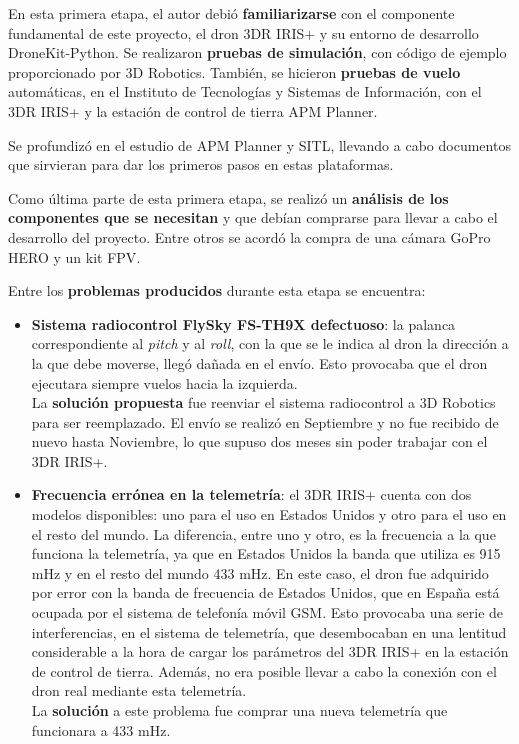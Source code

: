 En esta primera etapa, el autor debió \textbf{familiarizarse} con el componente fundamental de este proyecto, el dron 3DR IRIS+ y su entorno de desarrollo DroneKit-Python. Se realizaron \textbf{pruebas de simulación}, con código de ejemplo proporcionado por 3D Robotics. También, se hicieron \textbf{pruebas de vuelo} automáticas, en el Instituto de Tecnologías y Sistemas de Información, con el 3DR IRIS+ y la estación de control de tierra APM Planner.

Se profundizó en el estudio de APM Planner y \acs{SITL}, llevando a cabo documentos que sirvieran para dar los primeros pasos en estas plataformas.

Como última parte de esta primera etapa, se realizó un \textbf{análisis de los componentes que se necesitan} y que debían comprarse para llevar a cabo el desarrollo del proyecto. Entre otros se acordó la compra de una cámara GoPro HERO y un kit \acs{FPV}.

Entre los \textbf{problemas producidos} durante esta etapa se encuentra:
\begin{itemize}
\item \textbf{Sistema radiocontrol FlySky FS-TH9X defectuoso}: la palanca correspondiente al \textit{pitch} y al \textit{roll}, con la que se le indica al dron la dirección a la que debe moverse, llegó dañada en el envío. Esto provocaba que el dron ejecutara siempre vuelos hacia la izquierda.\\ La \textbf{solución propuesta} fue reenviar el sistema radiocontrol a 3D Robotics para ser reemplazado. El envío se realizó en Septiembre y no fue recibido de nuevo hasta Noviembre, lo que supuso dos meses sin poder trabajar con el 3DR IRIS+.
\item \textbf{Frecuencia errónea en la telemetría}: el 3DR IRIS+ cuenta con dos modelos disponibles: uno para el uso en Estados Unidos y otro para el uso en el resto del mundo. La diferencia, entre uno y otro, es la frecuencia a la que funciona la telemetría, ya que en Estados Unidos la banda que utiliza es 915 mHz y en el resto del mundo 433 mHz. En este caso, el dron fue adquirido por error con la banda de frecuencia de Estados Unidos, que en España está ocupada por el sistema de telefonía móvil \acs{GSM}. Esto provocaba una serie de interferencias, en el sistema de telemetría, que desembocaban en una lentitud considerable a la hora de cargar los parámetros del 3DR IRIS+ en la estación de control de tierra. Además, no era posible llevar a cabo la conexión con el dron real mediante esta telemetría.\\ La \textbf{solución} a este problema fue comprar una nueva telemetría que funcionara a 433 mHz.
\end{itemize}


